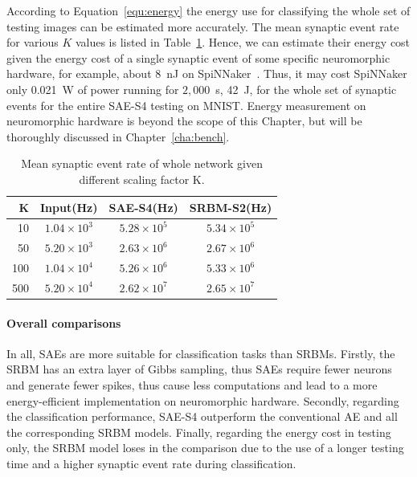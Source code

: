 According to Equation~\ref{equ:energy} the energy use for classifying the whole set of testing images can be estimated more accurately.
The mean synaptic event rate for various $K$ values is listed in Table~\ref{tbl:fire_rate}.
Hence, we can estimate their energy cost given the energy cost of a single synaptic event of some specific neuromorphic hardware, for example, about 8~nJ on SpiNNaker~\citep{stromatias2013power}.
Thus, it may cost SpiNNaker only 0.021~W of power running for $2,000$~s, 42~J, for the whole set of synaptic events for the entire SAE-S4 testing on MNIST.
Energy measurement on neuromorphic hardware is beyond the scope of this Chapter, but will be thoroughly discussed in Chapter~\ref{cha:bench}.
\begin{table}[htbp]
	\centering
	\caption[Mean synaptic event rate.]{Mean synaptic event rate of whole network given different scaling factor K.}
	\bgroup
	\def\arraystretch{1.4}
	\begin{tabular}{r c c c}
		K & Input(Hz) & SAE-S4(Hz) & SRBM-S2(Hz)\\
		\hline
		10 & $1.04 \times 10^3$ & $5.28 \times 10^5$ & $5.34 \times 10^5$ \\
		50 & $5.20 \times 10^3$ & $2.63 \times 10^6$ & $2.67 \times 10^6$ \\
		100 & $1.04 \times 10^4$ & $5.26 \times 10^6$ & $5.33 \times 10^6$ \\
		500 & $5.20 \times 10^4$ & $2.62 \times 10^7$ & $2.65 \times 10^7$ \\
	\end{tabular}
	\egroup
	\label{tbl:fire_rate}
\end{table}

\paragraph{Overall comparisons\\}

In all, SAEs are more suitable for classification tasks than SRBMs.
Firstly, the SRBM has an extra layer of Gibbs sampling, thus SAEs require fewer neurons and generate fewer spikes, thus cause less computations and lead to a  more energy-efficient implementation on neuromorphic hardware.
Secondly, regarding the classification performance, SAE-S4 outperform the conventional AE and all the corresponding SRBM models.
Finally, regarding the energy cost in testing only, the SRBM model loses in the comparison due to the use of a longer testing time and a higher synaptic event rate during classification.

